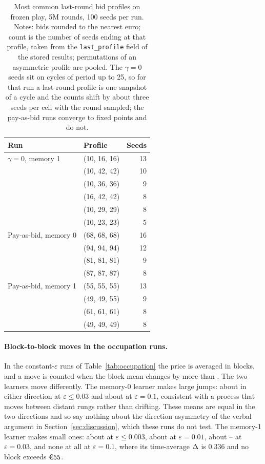 \begin{table}[htbp]
\centering
\caption{Most common last-round bid profiles on frozen play, 5M rounds, 100 seeds per run. Notes: bids rounded to the nearest euro; count is the number of seeds ending at that profile, taken from the \texttt{last\_profile} field of the stored results; permutations of an asymmetric profile are pooled. The $\gamma = 0$ seeds sit on cycles of period up to 25, so for that run a last-round profile is one snapshot of a cycle and the counts shift by about three seeds per cell with the round sampled; the pay-as-bid runs converge to fixed points and do not.}
\label{tab:app-profiles}
\begin{tabular}{llr}
\toprule
Run & Profile & Seeds \\
\midrule
$\gamma = 0$, memory 1 & (10, 16, 16) & 13 \\
 & (10, 42, 42) & 10 \\
 & (10, 36, 36) & 9 \\
 & (16, 42, 42) & 8 \\
 & (10, 29, 29) & 8 \\
 & (10, 23, 23) & 5 \\
\midrule
Pay-as-bid, memory 0 & (68, 68, 68) & 16 \\
 & (94, 94, 94) & 12 \\
 & (81, 81, 81) & 9 \\
 & (87, 87, 87) & 8 \\
\midrule
Pay-as-bid, memory 1 & (55, 55, 55) & 13 \\
 & (49, 49, 55) & 9 \\
 & (61, 61, 61) & 8 \\
 & (49, 49, 49) & 8 \\
\bottomrule
\end{tabular}
\end{table}

\paragraph{Block-to-block moves in the occupation runs.} In the constant-$\varepsilon$ runs of Table~\ref{tab:occupation} the price is averaged in blocks, and a move is counted when the block mean changes by more than . The two learners move differently. The memory-0 learner makes large jumps: about  in either direction at $\varepsilon \le 0.03$ and about  at $\varepsilon = 0.1$, consistent with a process that moves between distant rungs rather than drifting. These means are equal in the two directions and so say nothing about the direction asymmetry of the verbal argument in Section~\ref{sec:discussion}, which these runs do not test. The memory-1 learner makes small ones: about  at $\varepsilon \le 0.003$, about  at $\varepsilon = 0.01$, about -- at $\varepsilon = 0.03$, and none at all at $\varepsilon = 0.1$, where its time-average $\Delta$ is 0.336 and no block exceeds $\eur{55}$.

